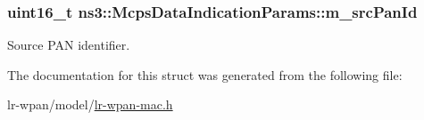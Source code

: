 \subsubsection[{\texorpdfstring{m\+\_\+src\+Pan\+Id}{m_srcPanId}}]{\setlength{\rightskip}{0pt plus 5cm}uint16\+\_\+t ns3\+::\+Mcps\+Data\+Indication\+Params\+::m\+\_\+src\+Pan\+Id}\hypertarget{structns3_1_1McpsDataIndicationParams_aa009743fe0885f0d00f174f29a1d118b}{}\label{structns3_1_1McpsDataIndicationParams_aa009743fe0885f0d00f174f29a1d118b}


Source P\+AN identifier. 



The documentation for this struct was generated from the following file\+:\begin{DoxyCompactItemize}
\item 
lr-\/wpan/model/\hyperlink{lr-wpan-mac_8h}{lr-\/wpan-\/mac.\+h}\end{DoxyCompactItemize}
